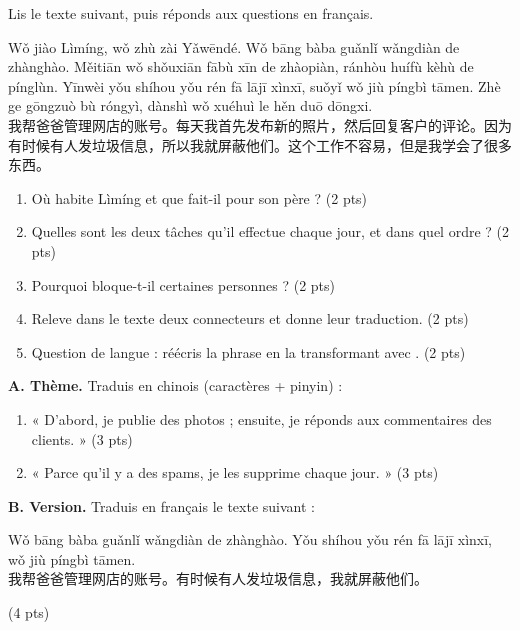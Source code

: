 \documentclass[11pt]{article}
\newcommand{\zh}[1]{\ifmmode\text{#1}\else{#1}\fi}
\begin{document}
\begin{exercice}
Lis le texte suivant, puis réponds aux questions en français.

\begin{textebox}
Wǒ jiào Lìmíng, wǒ zhù zài Yǎwēndé. Wǒ bāng bàba guǎnlǐ wǎngdiàn de zhànghào. Měitiān wǒ shǒuxiān fābù xīn de zhàopiàn, ránhòu huífù kèhù de pínglùn. Yīnwèi yǒu shíhou yǒu rén fā lājī xìnxī, suǒyǐ wǒ jiù píngbì tāmen. Zhè ge gōngzuò bù róngyì, dànshì wǒ xuéhuì le hěn duō dōngxi.\\
我帮爸爸管理网店的账号。每天我首先发布新的照片，然后回复客户的评论。因为有时候有人发垃圾信息，所以我就屏蔽他们。这个工作不容易，但是我学会了很多东西。
\end{textebox}

\begin{enumerate}
\item Où habite Lìmíng et que fait-il pour son père ? (2 pts)
\item Quelles sont les deux tâches qu'il effectue chaque jour, et dans quel ordre ? (2 pts)
\item Pourquoi bloque-t-il certaines personnes ? (2 pts)
\item Releve dans le texte deux connecteurs et donne leur traduction. (2 pts)
\item Question de langue : réécris la phrase \zh{我回复客户的评论} en la transformant avec \zh{把}. (2 pts)
\end{enumerate}
\end{exercice}

\begin{exercice}
\textbf{A. Thème.} Traduis en chinois (caractères + pinyin) :
\begin{enumerate}
\item « D'abord, je publie des photos ; ensuite, je réponds aux commentaires des clients. » (3 pts)
\item « Parce qu'il y a des spams, je les supprime chaque jour. » (3 pts)
\end{enumerate}
\textbf{B. Version.} Traduis en français le texte suivant :
\begin{textebox}[À traduire]
Wǒ bāng bàba guǎnlǐ wǎngdiàn de zhànghào. Yǒu shíhou yǒu rén fā lājī xìnxī, wǒ jiù píngbì tāmen.\\
我帮爸爸管理网店的账号。有时候有人发垃圾信息，我就屏蔽他们。
\end{textebox}
(4 pts)
\end{exercice}
\end{document}
